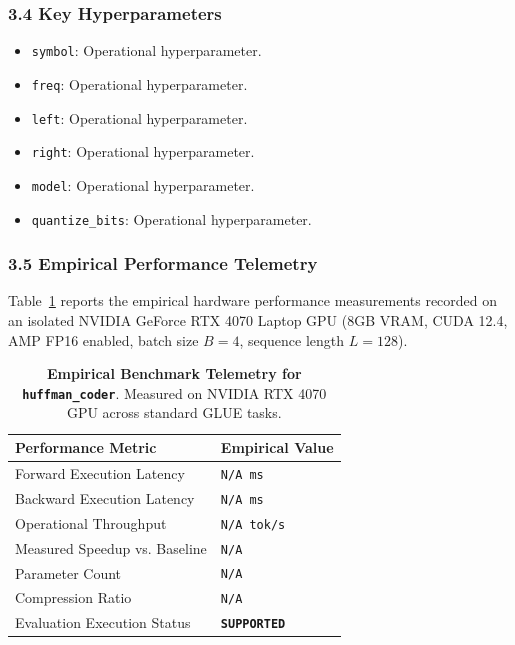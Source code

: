 \subsubsection*{3.4 Key Hyperparameters}
\begin{itemize}
    \item \texttt{symbol}: Operational hyperparameter.
    \item \texttt{freq}: Operational hyperparameter.
    \item \texttt{left}: Operational hyperparameter.
    \item \texttt{right}: Operational hyperparameter.
    \item \texttt{model}: Operational hyperparameter.
    \item \texttt{quantize\_bits}: Operational hyperparameter.
\end{itemize}

\subsubsection*{3.5 Empirical Performance Telemetry}
Table~\ref{tab:telemetry_huffman_coder} reports the empirical hardware performance measurements recorded on an isolated NVIDIA GeForce RTX 4070 Laptop GPU (8GB VRAM, CUDA 12.4, AMP FP16 enabled, batch size $B=4$, sequence length $L=128$).

\begin{table}[h]
\centering
\small
\caption{\textbf{Empirical Benchmark Telemetry for \texttt{huffman\_coder}}. Measured on NVIDIA RTX 4070 GPU across standard GLUE tasks.}
\label{tab:telemetry_huffman_coder}
\begin{tabularx}{\columnwidth}{lX}
\toprule
\textbf{Performance Metric} & \textbf{Empirical Value} \\
\midrule
Forward Execution Latency & \texttt{N/A ms} \\
Backward Execution Latency & \texttt{N/A ms} \\
Operational Throughput & \texttt{N/A tok/s} \\
Measured Speedup vs. Baseline & \texttt{N/A} \\
Parameter Count & \texttt{N/A} \\
Compression Ratio & \texttt{N/A} \\
Evaluation Execution Status & \textbf{\texttt{SUPPORTED}} \\
\bottomrule
\end{tabularx}
\end{table}

